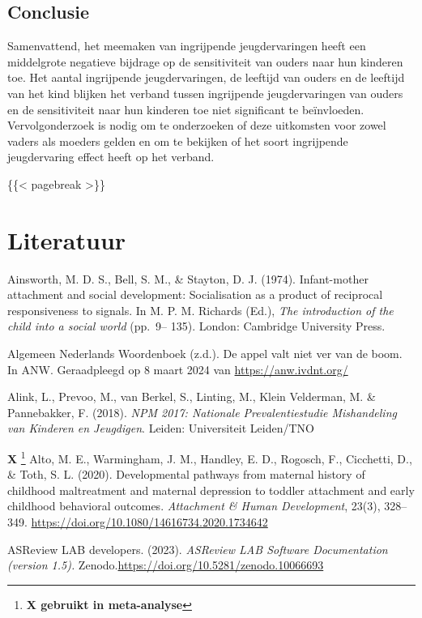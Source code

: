 \documentclass[12pt]{article}
\begin{document}
\subsection{Conclusie}\label{conclusie}

Samenvattend, het meemaken van ingrijpende jeugdervaringen heeft een
middelgrote negatieve bijdrage op de sensitiviteit van ouders naar hun
kinderen toe. Het aantal ingrijpende jeugdervaringen, de leeftijd van
ouders en de leeftijd van het kind blijken het verband tussen
ingrijpende jeugdervaringen van ouders en de sensitiviteit naar hun
kinderen toe niet significant te beïnvloeden. Vervolgonderzoek is nodig
om te onderzoeken of deze uitkomsten voor zowel vaders als moeders
gelden en om te bekijken of het soort ingrijpende jeugdervaring effect
heeft op het verband.

\{\{\textless{} pagebreak \textgreater\}\}

\section{Literatuur}\label{literatuur}

Ainsworth, M. D. S., Bell, S. M., \& Stayton, D. J. (1974).
Infant-mother attachment and social development: Socialisation as a
product of reciprocal responsiveness to signals. In M. P. M. Richards
(Ed.), \emph{The introduction of the child into a social world} (pp.~9--
135). London: Cambridge University Press.

Algemeen Nederlands Woordenboek (z.d.). De appel valt niet ver van de
boom. In ANW. Geraadpleegd op 8 maart 2024 van
\url{https://anw.ivdnt.org/}

Alink, L., Prevoo, M., van Berkel, S., Linting, M., Klein Velderman, M.
\& Pannebakker, F. (2018). \emph{NPM 2017: Nationale Prevalentiestudie
Mishandeling van Kinderen en Jeugdigen}. Leiden: Universiteit Leiden/TNO

\textbf{X} \footnote{\textbf{X gebruikt in meta-analyse}} Alto, M. E.,
Warmingham, J. M., Handley, E. D., Rogosch, F., Cicchetti, D., \& Toth,
S. L. (2020). Developmental pathways from maternal history of childhood
maltreatment and maternal depression to toddler attachment and early
childhood behavioral outcomes. \emph{Attachment \& Human Development},
23(3), 328--349. \url{https://doi.org/10.1080/14616734.2020.1734642}

ASReview LAB developers. (2023). \emph{ASReview LAB Software
Documentation (version 1.5).}
Zenodo.\url{https://doi.org/10.5281/zenodo.10066693}
\end{document}
